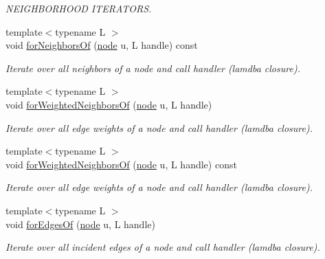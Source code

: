\begin{DoxyCompactItemize}
\begin{DoxyCompactList}\small\item\em N\-E\-I\-G\-H\-B\-O\-R\-H\-O\-O\-D I\-T\-E\-R\-A\-T\-O\-R\-S. \end{DoxyCompactList}\item 
{\footnotesize template$<$typename L $>$ }\\void \hyperlink{class_ensemble_clustering_1_1_graph_ad324ac3dcebfdf9b1c612b803c82e276}{for\-Neighbors\-Of} (\hyperlink{namespace_ensemble_clustering_ae829290aeccd1a420b17a37fd901f114}{node} u, L handle) const 
\begin{DoxyCompactList}\small\item\em Iterate over all neighbors of a node and call handler (lamdba closure). \end{DoxyCompactList}\item 
{\footnotesize template$<$typename L $>$ }\\void \hyperlink{class_ensemble_clustering_1_1_graph_aaa8ec445c018c465d6dc69980ce44972}{for\-Weighted\-Neighbors\-Of} (\hyperlink{namespace_ensemble_clustering_ae829290aeccd1a420b17a37fd901f114}{node} u, L handle)
\begin{DoxyCompactList}\small\item\em Iterate over all edge weights of a node and call handler (lamdba closure). \end{DoxyCompactList}\item 
{\footnotesize template$<$typename L $>$ }\\void \hyperlink{class_ensemble_clustering_1_1_graph_a3c1157d741621dda055056d1d5e014b9}{for\-Weighted\-Neighbors\-Of} (\hyperlink{namespace_ensemble_clustering_ae829290aeccd1a420b17a37fd901f114}{node} u, L handle) const 
\begin{DoxyCompactList}\small\item\em Iterate over all edge weights of a node and call handler (lamdba closure). \end{DoxyCompactList}\item 
{\footnotesize template$<$typename L $>$ }\\void \hyperlink{class_ensemble_clustering_1_1_graph_aab71cc92f41f6df6a1b51d5142f7ed66}{for\-Edges\-Of} (\hyperlink{namespace_ensemble_clustering_ae829290aeccd1a420b17a37fd901f114}{node} u, L handle)
\begin{DoxyCompactList}\small\item\em Iterate over all incident edges of a node and call handler (lamdba closure). \end{DoxyCompactList}\item 

\end{DoxyCompactItemize}
